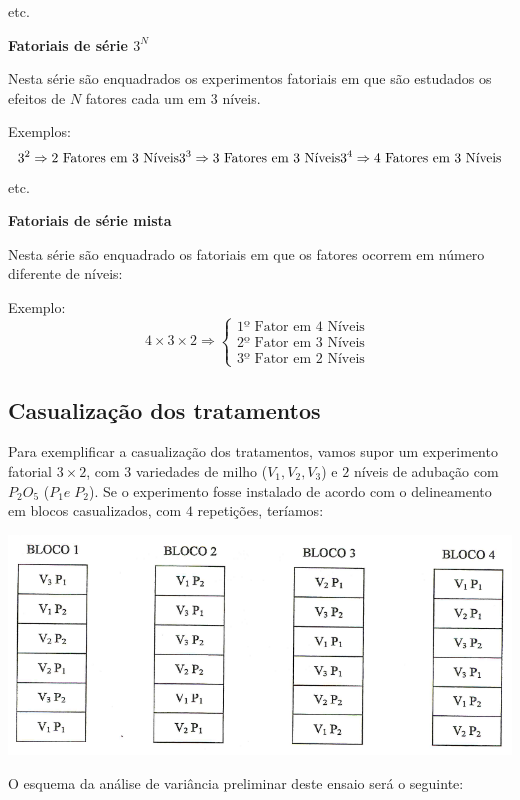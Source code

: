 \documentclass[
]{article}
\begin{document}
etc.

\textbf{Fatoriais de série \(3^N\)}

Nesta série são enquadrados os experimentos fatoriais em que são
estudados os efeitos de \(N\) fatores cada um em \(3\) níveis.

Exemplos: \[
3^2 \Rightarrow \text{2 Fatores em 3 Níveis} \\
3^3 \Rightarrow \text{3 Fatores em 3 Níveis} \\
3^4 \Rightarrow \text{4 Fatores em 3 Níveis} \\
\] etc.

\textbf{Fatoriais de série mista}

Nesta série são enquadrado os fatoriais em que os fatores ocorrem em
número diferente de níveis:

Exemplo: \[
4\times 3\times 2 \Rightarrow \begin{cases} \text{1º Fator em 4 Níveis }\\ \text{2º Fator em 3 Níveis } \\ \text{3º Fator em 2 Níveis } \end{cases}
\]

\subsection{Casualização dos
tratamentos}\label{casualizauxe7uxe3o-dos-tratamentos}

Para exemplificar a casualização dos tratamentos, vamos supor um
experimento fatorial \(3 \times 2\), com \(3\) variedades de milho
(\(V_1,V_2,V_3\)) e \(2\) níveis de adubação com \(P_2O_5\)
(\(P_1 e\; P_2\)). Se o experimento fosse instalado de acordo com o
delineamento em blocos casualizados, com \(4\) repetições, teríamos:

\includegraphics{Casuali.png}

O esquema da análise de variância preliminar deste ensaio será o
seguinte:
\end{document}
